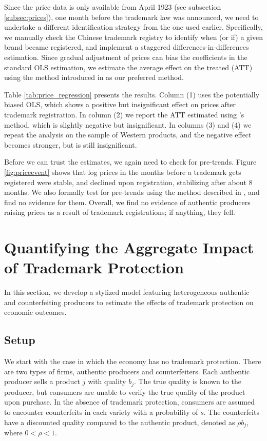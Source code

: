 \documentclass[12pt]{article}
\begin{document}
Since the price data  is only available from April 1923 (see subsection  \ref{subsec:prices}), one month before the trademark law was announced, we need to undertake a different identification strategy from the one used earlier. Specifically, we manually check the Chinese trademark registry to identify when (or if) a given brand became registered, and implement a staggered differences-in-differences estimation. Since gradual adjustment of prices can bias the coefficients in the standard OLS estimation, we estimate the average effect on the treated (ATT) using the method introduced in \cite{CallawaySantAnna2020} as our preferred method. 

Table \ref{tab:price_regression} presents the results. Column (1) uses the potentially biased OLS, which shows a positive but insignificant effect on prices after trademark registration. In column (2) we report the ATT estimated using \cite{CallawaySantAnna2020}'s method, which is slightly negative but insignificant. In columns (3) and (4) we repeat the analysis on the sample of Western products, and the negative effect becomes stronger, but is still insignificant.

Before we can trust the estimates, we again need to check for pre-trends. Figure  \ref{fig:priceevent} shows that  log prices in the months before a trademark gets registered were stable, and declined upon registration, stabilizing  after about 8 months. We also formally test for pre-trends using the method described in \citep{CallawaySantAnna2020}, and find no evidence for them. Overall, we find no evidence of authentic producers raising prices as a result of trademark registrations; if anything, they fell.

\section{Quantifying the Aggregate Impact of Trademark Protection}
\label{sec:model}

In this section, we develop a stylized model featuring heterogeneous authentic and counterfeiting producers to estimate the effects of trademark protection on economic outcomes.

\subsection{Setup}

We start with the case in which the economy has no trademark protection. There are two types of firms, authentic producers and counterfeiters. Each authentic producer sells a product $j$ with quality $b_{j}$. The true quality is known to the producer, but consumers are unable to verify the true quality of the product upon purchase. In the absence of trademark protection, consumers are assumed to encounter counterfeits in each variety with a probability of $s$. The counterfeits have a discounted quality compared to the authentic product, denoted as $\rho b_{j}$, where $0< \rho < 1$.
\end{document}
